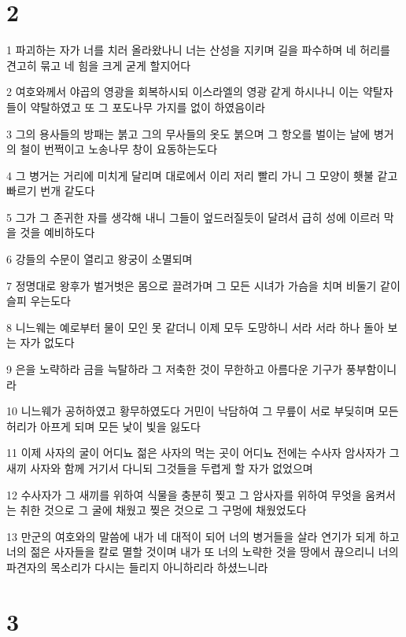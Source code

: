 \chapter{2}

\par 1 파괴하는 자가 너를 치러 올라왔나니 너는 산성을 지키며 길을 파수하며 네 허리를 견고히 묶고 네 힘을 크게 굳게 할지어다
\par 2 여호와께서 야곱의 영광을 회복하시되 이스라엘의 영광 같게 하시나니 이는 약탈자들이 약탈하였고 또 그 포도나무 가지를 없이 하였음이라
\par 3 그의 용사들의 방패는 붉고 그의 무사들의 옷도 붉으며 그 항오를 벌이는 날에 병거의 철이 번쩍이고 노송나무 창이 요동하는도다
\par 4 그 병거는 거리에 미치게 달리며 대로에서 이리 저리 빨리 가니 그 모양이 횃불 같고 빠르기 번개 같도다
\par 5 그가 그 존귀한 자를 생각해 내니 그들이 엎드러질듯이 달려서 급히 성에 이르러 막을 것을 예비하도다
\par 6 강들의 수문이 열리고 왕궁이 소멸되며
\par 7 정명대로 왕후가 벌거벗은 몸으로 끌려가며 그 모든 시녀가 가슴을 치며 비둘기 같이 슬피 우는도다
\par 8 니느웨는 예로부터 물이 모인 못 같더니 이제 모두 도망하니 서라 서라 하나 돌아 보는 자가 없도다
\par 9 은을 노략하라 금을 늑탈하라 그 저축한 것이 무한하고 아름다운 기구가 풍부함이니라
\par 10 니느웨가 공허하였고 황무하였도다 거민이 낙담하여 그 무릎이 서로 부딪히며 모든 허리가 아프게 되며 모든 낯이 빛을 잃도다
\par 11 이제 사자의 굴이 어디뇨 젊은 사자의 먹는 곳이 어디뇨 전에는 수사자 암사자가 그 새끼 사자와 함께 거기서 다니되 그것들을 두렵게 할 자가 없었으며
\par 12 수사자가 그 새끼를 위하여 식물을 충분히 찢고 그 암사자를 위하여 무엇을 움켜서는 취한 것으로 그 굴에 채웠고 찢은 것으로 그 구멍에 채웠었도다
\par 13 만군의 여호와의 말씀에 내가 네 대적이 되어 너의 병거들을 살라 연기가 되게 하고 너의 젊은 사자들을 칼로 멸할 것이며 내가 또 너의 노략한 것을 땅에서 끊으리니 너의 파견자의 목소리가 다시는 들리지 아니하리라 하셨느니라

\chapter{3}

